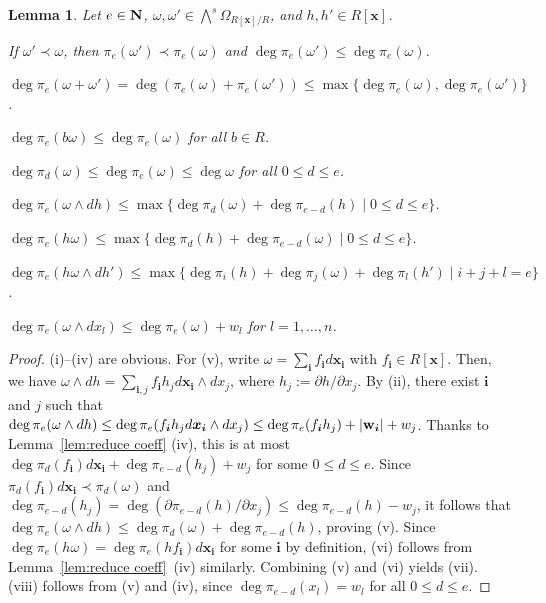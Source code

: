 \documentclass{amsart}
\theoremstyle{plain}
\newtheorem{lem}[thm]{Lemma}
\theoremstyle{definition}
\newcommand{\nd}{\noindent}
\newcommand{\N}{{\bf N}}
\newcommand{\x}{{\boldsymbol x}}
\newcommand{\w}{{\bf w}}
\newcommand{\bi}{{\boldsymbol i}}
\newcommand{\Rx}{R[\x]}
\newcommand{\degw  }{\deg}
\begin{document}
\begin{lem}\label{lem:reduce coeff2}
Let $e\in \N $, 
$\omega ,\omega '\in \bigwedge ^s\Omega _{\Rx /R}$, 
and $h,h'\in \Rx $. 

\nd{\rm (i)} 
If $\omega '\prec \omega $, 
then $\pi _e(\omega ')\prec \pi _e(\omega )$ and 
$\deg \pi _e(\omega ')\le \deg \pi _e(\omega )$. 


\nd{\rm (ii)} 
$\deg \pi _e(\omega +\omega ')
=\deg (\pi _e(\omega )+\pi _e(\omega '))
\le \max \{ \degw \pi _e(\omega ),\degw \pi _e(\omega ')\} $. 


\nd{\rm (iii)} 
$\deg \pi _e(b\omega )\le \deg \pi _e(\omega )$ 
for all $b\in R$. 


\nd{\rm (iv)} 
$\deg \pi _d(\omega )\le \deg \pi _e(\omega )\le \deg \omega $ 
for all $0\le d\le e$. 


\nd{\rm (v)} 
$\degw \pi _e(\omega \wedge dh)\le 
\max \{ \degw \pi _{d}(\omega )+\degw \pi _{e-d}(h)\mid 
0\le d\le e\} $. 


\nd{\rm (vi)} 
$\degw \pi _e(h\omega )\le 
\max \{ \degw \pi _{d}(h)+\degw \pi _{e-d}(\omega )\mid 
0\le d\le e\} $. 



\nd{\rm (vii)} 
$\degw \pi _e(h\omega \wedge dh')\le 
\max \{ \degw \pi _{i}(h)
+\degw \pi _{j}(\omega)
+\degw \pi _{l}(h')
\mid i+j+l=e\} $.


\nd{\rm (viii)} 
$\degw \pi _e(\omega \wedge dx_l)
\le \degw \pi _e(\omega )+w_l$ 
for $l=1,\ldots ,n$. 
\end{lem}
\begin{proof}
(i)--(iv) are obvious. 
For (v), 
write $\omega =\sum _{\bi }f_{\bi }d\x _{\bi }$ with $f_{\bi }\in \Rx $. 
Then, 
we have 
$\omega \wedge dh
=\sum _{\bi ,j}f_{\bi }h_jd\x _{\bi }\wedge dx_j$, 
where 
$h_j:=\partial h/\partial x_j$. 
By (ii), 
there exist $\bi $ and $j$ such that 
$\deg \pi _e(\omega \wedge dh)
\le \deg \pi _e(f_{\bi }h_jd\x _{\bi }\wedge dx_j)
\le \deg \pi _e(f_{\bi }h_j)+|\w _{\bi }|+w_j$. 
Thanks to Lemma~\ref{lem:reduce coeff} (iv), 
this is at most 
$\deg \pi _{d}(f_{\bi })d\x _{\bi }+\deg \pi _{e-d}(h_j)+w_j$ 
for some $0\le d\le e$. 
Since $\pi _{d}(f_{\bi })d\x _{\bi }\prec \pi _{d}(\omega )$ 
and 
$\deg \pi _{e-d}(h_j)
=\deg (\partial \pi _{e-d}(h)/\partial x_j)\le \deg \pi _{e-d}(h)-w_j$, 
it follows that $\degw \pi _e(\omega \wedge dh)
\le \degw \pi _{d}(\omega )+\degw \pi _{e-d}(h)$, 
proving (v). 
Since 
$\degw \pi _e(h\omega )=\degw \pi _e(hf_{\bi })d\x _{\bi }$ 
for some $\bi $ by definition, 
(vi) follows from Lemma~\ref{lem:reduce coeff}~(iv) similarly. 
Combining (v) and (vi) yields (vii). 
(viii) follows from (v) and (iv), 
since $\deg \pi _{e-d}(x_l)=w_l$ for all $0\le d\le e$. 
\end{proof}
\end{document}
